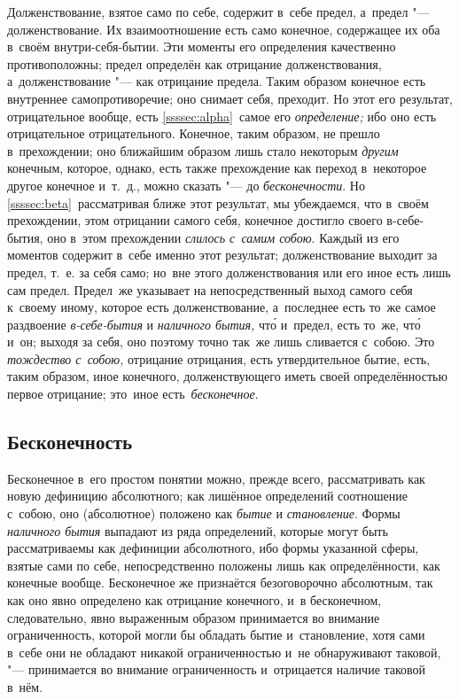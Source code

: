 Долженствование, взятое само по себе, содержит в~себе предел, а~предел "---
долженствование. Их взаимоотношение есть само конечное, содержащее их оба
в~своём внутри-себя-бытии. Эти моменты его определения качественно
противоположны; предел определён как отрицание долженствования,
а~долженствование "--- как отрицание предела. Таким образом конечное есть
внутреннее самопротиворечие; оно снимает себя, преходит. Но этот его результат,
отрицательное вообще, есть \ref{ssssec:alpha}~самое
его {\em определение;} ибо оно есть
отрицательное отрицательного. Конечное, таким образом, не прешло в~прехождении;
оно ближайшим образом лишь стало некоторым {\em другим} конечным, которое,
однако, есть также прехождение как переход в~некоторое другое конечное и~т.~д.,
можно сказать "--- до {\em бесконечности}. Но \ref{ssssec:beta}~рассматривая ближе этот
результат, мы убеждаемся, что в~своём прехождении, этом отрицании самого себя,
конечное достигло своего в-себе-бытия, оно в~этом прехождении
{\em слилось с~самим собою}. Каждый из его моментов содержит в~себе именно этот
результат; долженствование выходит за предел, т.~е. за себя само; но~вне этого
долженствования или его иное есть лишь сам предел. Предел~же указывает
на непосредственный выход самого себя к~своему иному, которое есть
долженствование, а~последнее есть то~же самое раздвоение {\em в-себе-бытия} и
{\em наличного бытия,} чт\'{о} и~предел, есть то~же, чт\'{о} и~он; выходя за себя,
оно поэтому точно так~же лишь сливается с~собою. Это {\em тождество с~собою,}
отрицание отрицания, есть утвердительное бытие, есть, таким образом, иное
конечного, долженствующего иметь своей определённостью первое отрицание;
это~иное есть~{\em бесконечное}.

\subsection{Бесконечность}

Бесконечное в~его простом понятии можно, прежде всего, рассматривать как новую
дефиницию абсолютного; как лишённое определений соотношение с~собою, оно
(абсолютное) положено как {\em бытие} и {\em становление}. Формы
{\em наличного бытия} выпадают из ряда определений, которые могут быть
рассматриваемы как дефиниции абсолютного, ибо формы указанной сферы, взятые
сами по себе, непосредственно положены лишь как определённости, как конечные
вообще. Бесконечное же признаётся безоговорочно абсолютным, так как оно явно
определено как отрицание конечного, и~в бесконечном, следовательно, явно
выраженным образом принимается во внимание ограниченность, которой могли бы
обладать бытие и~становление, хотя сами в~себе они не обладают никакой
ограниченностью и~не обнаруживают таковой, "--- принимается во внимание
ограниченность и~отрицается наличие таковой в~нём.

